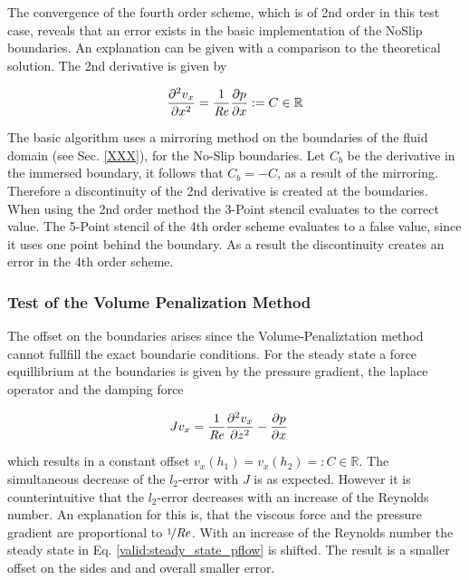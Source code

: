The convergence of the fourth order scheme, which is of 2nd order in this test case,
reveals that an error exists in the basic implementation of the NoSlip boundaries.
An explanation can be given with a comparison to the theoretical solution.
The 2nd derivative is given by

\begin{align}
    \pdn[^2 v_x]{x^2} = \frac{1}{\Rey}\pdn[p]{x} := C\in\mathbb{R}
\end{align}

The basic algorithm uses a mirroring method on the boundaries of the fluid domain (see Sec. \ref{XXX}), for the No-Slip boundaries.
Let $C_b$ be the derivative in the immersed boundary, it follows that $C_b = - C$, as a result of the mirroring.
Therefore a discontinuity of the 2nd derivative is created at the boundaries.
When using the 2nd order method the 3-Point stencil evaluates to the correct value.
The 5-Point stencil of the 4th order scheme evaluates to a false value, since it uses one point behind the boundary.
As a result the discontinuity creates an error in the 4th order scheme.

\subsubsection{Test of the Volume Penalization Method}

The offset on the boundaries arises since the Volume-Penaliztation method cannot fullfill the exact boundarie conditions.
For the steady state a force equillibrium at the boundaries is given by the pressure gradient, the laplace operator and the damping force

\begin{align}
\label{valid:steady_state_pflow}
 J v_x &=  \frac{1}{\Rey}\frac{\partial^2 v_x}{\partial z^2} -\pdn[p]{x}
\end{align}

which results in a constant offset $v_x(h_1) = v_x(h_2) =: C\in\mathbb{R}$.
The simultaneous decrease of the $l_2$-error with $J$ is as expected.
However it is counterintuitive that the $l_2$-error decreases with an increase of the Reynolds number.
An explanation for this is, that the viscous force and the pressure gradient are proportional to $\nicefrac{1}{\Rey}$.
With an increase of the Reynolds number the steady state in Eq. \ref{valid:steady_state_pflow} is shifted.
The result is a smaller offset on the sides and and overall smaller error.

